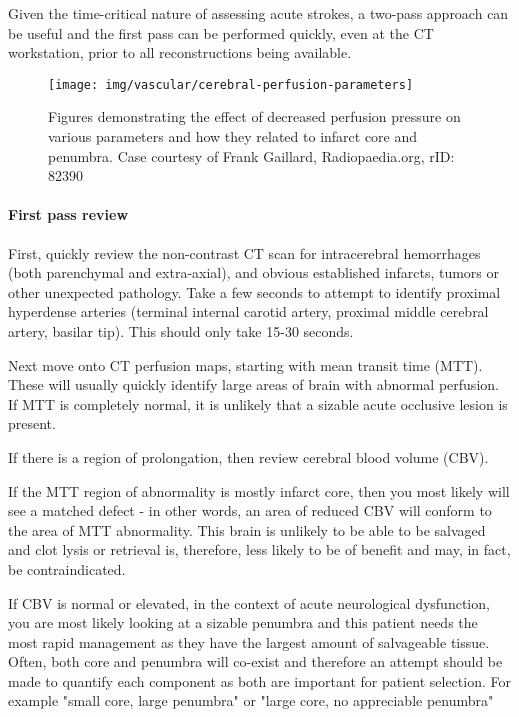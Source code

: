 Given the time-critical nature of assessing acute strokes, a two-pass approach can be useful and the first pass can be performed quickly, even at the CT workstation, prior to all reconstructions being available.

\begin{figure}
	\centering
	\texttt{[image: img/vascular/cerebral-perfusion-parameters]}
	\caption{Figures demonstrating the effect of decreased perfusion pressure on various parameters and how they related to infarct core and penumbra. Case courtesy of Frank Gaillard, Radiopaedia.org, rID: 82390}
	\label{fig:cerebral-perfusion-parameters}
\end{figure}

\paragraph{First pass review}

First, quickly review the non-contrast CT scan for intracerebral hemorrhages (both parenchymal and extra-axial), and obvious established infarcts, tumors or other unexpected pathology. Take a few seconds to attempt to identify proximal hyperdense arteries (terminal internal carotid artery, proximal middle cerebral artery, basilar tip). This should only take 15-30 seconds.

Next move onto CT perfusion maps, starting with mean transit time (MTT). These will usually quickly identify large areas of brain with abnormal perfusion. If MTT is completely normal, it is unlikely that a sizable acute occlusive lesion is present.

If there is a region of prolongation, then review cerebral blood volume (CBV).

If the MTT region of abnormality is mostly infarct core, then you most likely will see a matched defect - in other words, an area of reduced CBV will conform to the area of MTT abnormality. This brain is unlikely to be able to be salvaged and clot lysis or retrieval is, therefore, less likely to be of benefit and may, in fact, be contraindicated.

If CBV is normal or elevated, in the context of acute neurological dysfunction, you are most likely looking at a sizable penumbra and this patient needs the most rapid management as they have the largest amount of salvageable tissue. Often, both core and penumbra will co-exist and therefore an attempt should be made to quantify each component as both are important for patient selection. For example "small core, large penumbra" or "large core, no appreciable penumbra"

